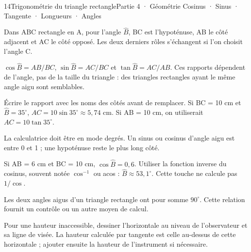 \begin{ouverture}[geometrie]{14}{Trigonométrie du triangle rectangle}{Partie 4 · Géométrie}
{Cosinus · Sinus · Tangente · Longueurs · Angles}
\end{ouverture}
\pagestyle{otMain}\essentiel\fontsize{11}{15}\selectfont
{}
\begin{definition}Dans ABC rectangle en A, pour l’angle $\widehat B$, BC est l’hypoténuse, AB le côté adjacent et AC le côté opposé. Les deux derniers rôles s’échangent si l’on choisit l’angle C.\end{definition}
\begin{propriete}$\cos\widehat B=AB/BC$, $\sin\widehat B=AC/BC$ et $\tan\widehat B=AC/AB$. Ces rapports dépendent de l’angle, pas de la taille du triangle : des triangles rectangles ayant le même angle aigu sont semblables.\end{propriete}
\begin{savoirfaire}Écrire le rapport avec les noms des côtés avant de remplacer. Si BC = 10 cm et $\widehat B=35^\circ$, $AC=10\sin35^\circ\approx5{,}74$ cm. Si AB = 10 cm, on utiliserait $AC=10\tan35^\circ$.\end{savoirfaire}
\begin{attention}La calculatrice doit être en mode degrés. Un sinus ou cosinus d’angle aigu est entre 0 et 1 ; une hypoténuse reste le plus long côté.\end{attention}
\clearpage
{}
\begin{savoirfaire}Si AB = 6 cm et BC = 10 cm, $\cos\widehat B=0{,}6$. Utiliser la fonction inverse du cosinus, souvent notée $\cos^{-1}$ ou acos : $\widehat B\approx53{,}1^\circ$. Cette touche ne calcule pas $1/\cos$.\end{savoirfaire}
\begin{propriete}Les deux angles aigus d’un triangle rectangle ont pour somme $90^\circ$. Cette relation fournit un contrôle ou un autre moyen de calcul.\end{propriete}
\begin{savoirfaire}Pour une hauteur inaccessible, dessiner l’horizontale au niveau de l’observateur et sa ligne de visée. La hauteur calculée par tangente est celle au-dessus de cette horizontale ; ajouter ensuite la hauteur de l’instrument si nécessaire.\end{savoirfaire}
